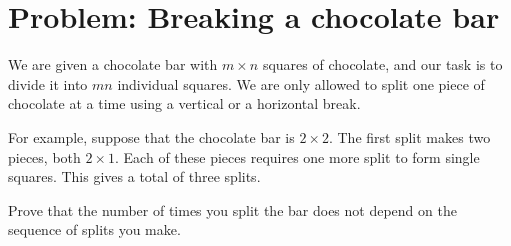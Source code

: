 \documentclass[12pt]{article}
\begin{document}




\section{Problem: Breaking a chocolate bar}

We are given a chocolate bar with $m \times n$ squares of
chocolate, and our task is to divide it into $mn$ individual squares.  We
are only allowed to split one piece of chocolate at a time using a
vertical or a horizontal break.

For example, suppose that the chocolate bar is $2 \times 2$.  The
first split makes two pieces, both $2 \times 1$.  Each of these pieces
requires one more split to form single squares.  This gives a total of
three splits.

Prove that the number of times you split the bar does not depend on the sequence of splits you make.
\end{document}
